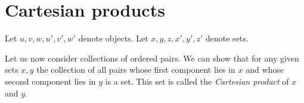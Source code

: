 \documentclass[../../set-theory.ftl.tex]{subfiles}
\begin{document}
  \section{Cartesian products}

  \begin{forthel}
  \end{forthel}

  \begin{forthel}
  \end{forthel}

  \begin{forthel}
    Let $u,v,w,u',v',w'$ denote objects.
    Let $x,y,z,x',y',z'$ denote sets.
  \end{forthel}

  \noindent Let us now consider collections of ordered pairs.
  We can show that for any given sets $x,y$ the collection of all pairs whose
  first component lies in $x$ and whose second component lies in $y$ is a set.
  This set is called the \textit{Cartesian product} of $x$ and $y$.
\end{document}
